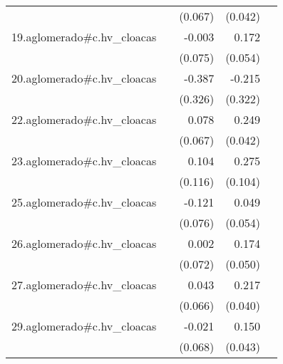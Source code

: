 {\begin{longtable}{l*{4}{D{.}{.}{-1}}}
            &                     &     (0.067)         &     (0.042)         &                     \\
\addlinespace
19.aglomerado#c.hv\_cloacas&                     &      -0.003         &       0.172\sym{**} &                     \\
            &                     &     (0.075)         &     (0.054)         &                     \\
\addlinespace
20.aglomerado#c.hv\_cloacas&                     &      -0.387         &      -0.215         &                     \\
            &                     &     (0.326)         &     (0.322)         &                     \\
\addlinespace
22.aglomerado#c.hv\_cloacas&                     &       0.078         &       0.249\sym{***}&                     \\
            &                     &     (0.067)         &     (0.042)         &                     \\
\addlinespace
23.aglomerado#c.hv\_cloacas&                     &       0.104         &       0.275\sym{**} &                     \\
            &                     &     (0.116)         &     (0.104)         &                     \\
\addlinespace
25.aglomerado#c.hv\_cloacas&                     &      -0.121         &       0.049         &                     \\
            &                     &     (0.076)         &     (0.054)         &                     \\
\addlinespace
26.aglomerado#c.hv\_cloacas&                     &       0.002         &       0.174\sym{***}&                     \\
            &                     &     (0.072)         &     (0.050)         &                     \\
\addlinespace
27.aglomerado#c.hv\_cloacas&                     &       0.043         &       0.217\sym{***}&                     \\
            &                     &     (0.066)         &     (0.040)         &                     \\
\addlinespace
29.aglomerado#c.hv\_cloacas&                     &      -0.021         &       0.150\sym{***}&                     \\
            &                     &     (0.068)         &     (0.043)         &                     \\

\end{longtable}}
